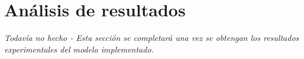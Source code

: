\section{Análisis de resultados}

\textit{Todavía no hecho - Esta sección se completará una vez se obtengan los resultados experimentales del modelo implementado.}

\pagebreak
